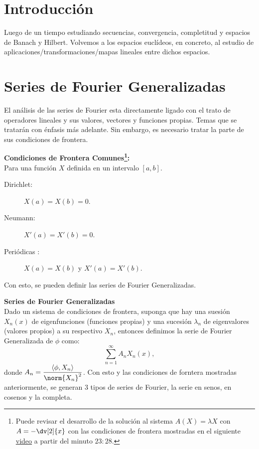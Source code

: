 \section*{Introducción}
Luego de un tiempo estudiando secuencias, convergencia, completitud y espacios de Banach y Hilbert. Volvemos a los espacios euclídeos, en concreto, al estudio de aplicaciones/transformaciones/mapas lineales entre dichos espacios. 


\section*{Series de Fourier Generalizadas}

El análisis de las series de Fourier esta directamente ligado con el trato de operadores lineales y sus valores, vectores y funciones propias. Temas que se tratarán con énfasis más adelante. Sin embargo, es necesario tratar la parte de sus condiciones de frontera.



\begin{mdframed}[style=warning]
	{\large \textbf{Condiciones de Frontera Comunes\footnote{Puede revisar el desarrollo de la solución al sistema $A(X) = \lambda X$ con $A = -\dv[2]{x}$ con las condiciones de frontera mostradas en el siguiente \href{https://www.youtube.com/watch?v=hhb7Wou8UzI}{video} a partir del minuto $23:28$.}:}} \\
	Para una función $X$ definida en un intervalo $[a,b]$.
	\begin{description}
		\item[Dirichlet: ] $X(a) = X(b) = 0$.
		\item[Neumann: ] $X'(a) = X'(b) = 0$.
		\item[Periódicas : ] $X(a) = X(b)$ y $X'(a) = X'(b)$.
	\end{description}
\end{mdframed}

Con esto, se pueden definir las series de Fourier Generalizadas.


\begin{mdframed}[style=warning]
	{\large \textbf{Series de Fourier Generalizadas}} \\
	Dado un sistema de condiciones de frontera, suponga que hay una suesión $X_n (x)$ de eigenfunciones (funciones propias) y una sucesión $\lambda _n$ de eigenvalores (valores propios) a su respectivo $X_n$, entonces definimos la serie de Fourier Generalizada de $\phi$ como:
		$$ \sum _{n = 1} ^\infty A_n X_n(x), $$
	donde $A_n = \dfrac{\inner{\phi}{X_n}}{\norm{X_n}^2}$. Con esto y las condiciones de forntera mostradas anteriormente, se generan $3$ tipos de series de Fourier, la serie en senos, en cosenos y la completa.
\end{mdframed}






